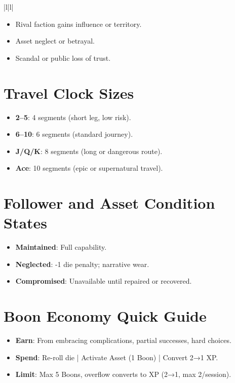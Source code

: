 \begin{itemular}{|l|l|}
\begin{itemize}
    \item Rival faction gains influence or territory.
    \item Asset neglect or betrayal.
    \item Scandal or public loss of trust.
\end{itemize}

\section*{Travel Clock Sizes}

\begin{itemize}
    \item \textbf{2–5}: 4 segments (short leg, low risk).
    \item \textbf{6–10}: 6 segments (standard journey).
    \item \textbf{J/Q/K}: 8 segments (long or dangerous route).
    \item \textbf{Ace}: 10 segments (epic or supernatural travel).
\end{itemize}

\section*{Follower and Asset Condition States}

\begin{itemize}
    \item \textbf{Maintained}: Full capability.
    \item \textbf{Neglected}: -1 die penalty; narrative wear.
    \item \textbf{Compromised}: Unavailable until repaired or recovered.
\end{itemize}

\section*{Boon Economy Quick Guide}

\begin{itemize}
    \item \textbf{Earn}: From embracing complications, partial successes, hard choices.
    \item \textbf{Spend}: Re-roll die | Activate Asset (1 Boon) | Convert 2→1 XP.
    \item \textbf{Limit}: Max 5 Boons, overflow converts to XP (2→1, max 2/session).
\end{itemize}


\end{itemular}

